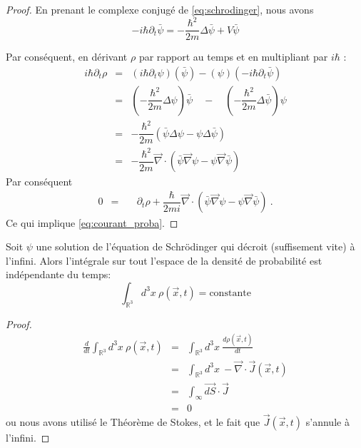 \documentclass{book}
\begin{document}
\begin{proof}
En prenant le complexe conjugé de \eqref{eq:schrodinger}, nous avons
\begin{equation} 
- i\hbar \partial_t \bar{\psi} = -\dfrac{\hbar^2}{2m} \Delta \bar{\psi}+ V \bar{\psi} 
\end{equation}

Par conséquent, en dérivant $\rho$ par rapport au temps et en multipliant par $i\hbar$ :
\begin{eqnarray*}
i\hbar \partial_t \rho &=& 
( i\hbar \partial_t \psi )(\bar{\psi})-(\psi )
(-i\hbar \partial_t \bar{\psi})\\
&=&\left(-\dfrac{\hbar^2}{2m} \Delta \psi\right) \bar{\psi} \quad - \quad \left(-\dfrac{\hbar^2}{2m} \Delta \bar{\psi}\right)\psi \\
&=& -\dfrac{\hbar^2}{2m} \left( \bar{\psi} \Delta \psi - \psi \Delta \bar{\psi} \right) \\
&=& -\dfrac{\hbar^2}{2m} \vec \nabla \cdot \left( \bar{\psi} \vec \nabla  \psi - \psi \vec \nabla  \bar{\psi} \right)
\end{eqnarray*}
Par conséquent
\begin{eqnarray*}
0 &=& \quad \partial_t \rho + \dfrac{\hbar}{2mi} \vec \nabla \cdot \left( \bar{\psi} \vec \nabla  \psi - \psi \vec \nabla  \bar{\psi} \right)\ .
\end{eqnarray*}
Ce qui implique \eqref{eq:courant_proba}.
\end{proof}


Soit $\psi$ une solution de l'équation de Schrödinger qui décroit (suffisement vite) à l'infini. Alors l'intégrale sur tout l'espace de la densité de probabilité est indépendante du temps:
\begin{equation} \label{eq:conserv_proba}
\boxed{
\int_{\mathbb R^3} d^3 x\  \rho(\vec x, t)  = \mathrm{constante}
}
\end{equation}

\begin{proof}
\begin{eqnarray*}
 \frac{d }{dt} 
\int_{\mathbb R^3} d^3 x\  \rho(\vec x, t) 
&=&
\int_{\mathbb R^3} d^3 x\   \frac{d\rho(\vec x, t) }{dt} \\
&=&
\int_{\mathbb R^3} d^3  x\   -\vec \nabla \cdot \vec J(\vec x, t) \\
&=&
\int_\infty \vec{dS} \cdot \vec J\\
&=&0
\end{eqnarray*}
ou nous avons utilisé le Théorème de Stokes, et le fait que $\vec J(\vec x, t)$ s'annule à l'infini.
\end{proof}
\end{document}
